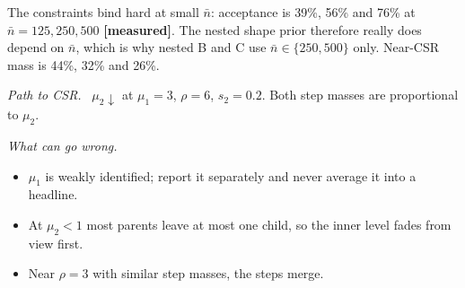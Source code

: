 \documentclass[10pt,a4paper]{article}
\newcommand{\measured}{\textcolor{green!45!black}{\textbf{[measured]}}}
\newcommand{\nbar}{\bar n}
\newcommand{\sub}[1]{\par\textit{#1}\ }
\begin{document}
The constraints bind hard at small $\nbar$: acceptance is 39\%, 56\% and 76\% at $\nbar=125,250,500$ \measured. The nested shape prior therefore really does depend on $\nbar$, which is why nested B and C use $\nbar\in\{250,500\}$ only. Near-CSR mass is 44\%, 32\% and 26\%.
\sub{Path to CSR.} $\mu_2\downarrow$ at $\mu_1=3$, $\rho=6$, $s_2=0.2$. Both step masses are proportional to $\mu_2$.
\sub{What can go wrong.}
\begin{itemize}
  \item $\mu_1$ is weakly identified; report it separately and never average it into a headline.
  \item At $\mu_2<1$ most parents leave at most one child, so the inner level fades from view first.
  \item Near $\rho=3$ with similar step masses, the steps merge.
\end{itemize}
\end{document}
